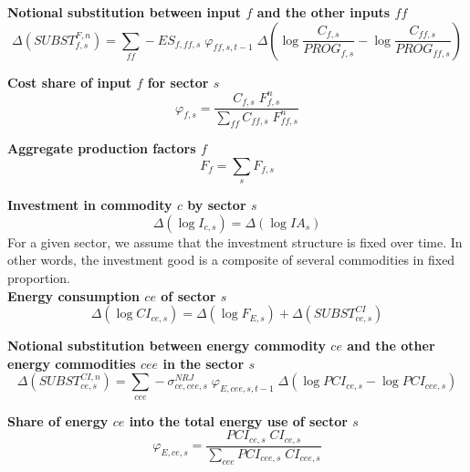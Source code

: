 \documentclass[12pt]{article}
\numberwithin{equation}{section}
\begin{document}
\noindent \textbf{Notional substitution between input $f$ and the other inputs $ff$} 
\begin{dmath}
\varDelta \left(SUBST^{F,n}_{f, s}\right) = \sum_{ff} -ES_{f, ff, s} \; \varphi_{ff, s, t-1} \; \varDelta \left(\operatorname{log} \frac{C_{f, s}}{PROG_{f, s}} - \operatorname{log} \frac{C_{ff, s}}{PROG_{ff, s}}\right)
\label{producer.mdlSUBST_F_n[f, s]}
\end{dmath}

\noindent \textbf{Cost share of input $f$ for sector $s$} 
\begin{dmath}
\varphi_{f, s} = \frac{C_{f, s} \; F^{n}_{f, s}}{\sum_{ff} C_{ff, s} \; F^{n}_{ff, s}}
\label{producer.mdlphi[f, s]}
\end{dmath}


\noindent \textbf{Aggregate production factors $f$} 
\begin{dmath}
F_{f} = \sum_{s} F_{f, s}
\label{producer.mdlF[f]}
\end{dmath}

\noindent \textbf{Investment in commodity $c$ by sector $s$} 
\begin{dmath}
\varDelta \left(\operatorname{log} I_{c, s}\right) = \varDelta \left(\operatorname{log} IA_{s}\right)
\label{producer.mdlI[c, s]}
\end{dmath}
For a given sector, we assume that the investment structure is fixed over time. In other words, the investment good is a composite of several commodities in fixed proportion. \\

\noindent \textbf{Energy consumption $ce$ of sector $s$} 
\begin{dmath}
\varDelta \left(\operatorname{log} CI_{ce, s}\right) = \varDelta \left(\operatorname{log} F_{E, s}\right) + \varDelta \left(SUBST^{CI}_{ce, s}\right)
\label{producer.mdlCI[ce, s]}
\end{dmath}

\noindent \textbf{Notional substitution between energy commodity $ce$ and the other energy commodities $cee$ in the sector $s$} 
\begin{dmath}
\varDelta \left(SUBST^{CI,n}_{ce, s}\right) = \sum_{cee} -\sigma^{NRJ}_{ce, cee, s} \; \varphi_{E, cee, s, t-1} \; \varDelta \left(\operatorname{log} PCI_{ce, s} - \operatorname{log} PCI_{cee, s}\right)
\label{producer.mdlSUBST_CI_n[ce, s]}
\end{dmath}

\noindent \textbf{Share of energy $ce$ into the total energy use of sector $s$} 
\begin{dmath}
\varphi_{E, ce, s} = \frac{PCI_{ce, s} \; CI_{ce, s}}{\sum_{cee} PCI_{cee, s} \; CI_{cee, s}}
\label{producer.mdlphi[E, ce, s]}
\end{dmath}
\end{document}
